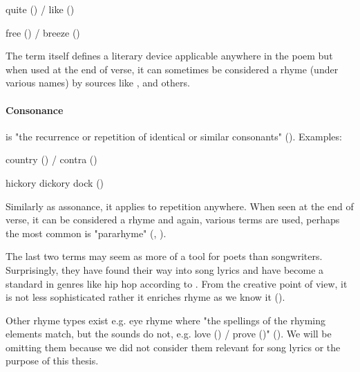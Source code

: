 quite () / like ()

free () / breeze ()

\noindent The term itself defines a literary device applicable anywhere in the poem but when used at the end of verse, it can sometimes be considered a rhyme (under various names) by sources like \cite{vanphonological}, \cite{bergman2017litcharts} and others.

\paragraph{Consonance} is "the recurrence or repetition of identical or similar consonants" (\cite{britannica}). Examples: 

country () / contra ()

hickory dickory dock ()

\noindent Similarly as assonance, it applies to repetition anywhere. When seen at the end of verse, it can be considered a rhyme and again, various terms are used, perhaps the most common is "pararhyme" (\cite{britannica}, \cite{oxforddict2008literary}).
\newline

The last two terms may seem as more of a tool for poets than songwriters. Surprisingly, they have found their way into song lyrics and have become a standard in genres like hip hop according to \cite{vanphonological}. From the creative point of view, it is not less sophisticated rather it enriches rhyme as we know it (\cite{brogan2016poeticterms}).

Other rhyme types exist e.g. eye rhyme where "the spellings of the rhyming elements match, but the sounds do not, e.g. love () / prove ()" (\cite{oxforddict2008literary}). We will be omitting them because we did not consider them relevant for song lyrics or the purpose of this thesis.



